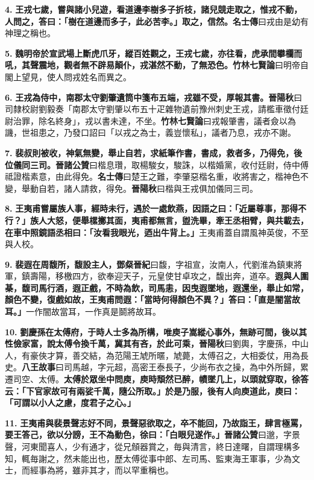 \textbf{4.} \textbf{王戎七歲，嘗與諸小兒遊，看道邊李樹多子折枝，諸兒競走取之，惟戎不動，人問之，答曰：「樹在道邊而多子，此必苦李。」取之，信然。}{\footnotesize \textbf{名士傳}曰戎由是幼有神理之稱也。}

\textbf{5.} \textbf{魏明帝於宣武場上斷虎爪牙，縱百姓觀之，王戎七歲，亦往看，虎承間攀欄而吼，其聲震地，觀者無不辟易顛仆，戎湛然不動，了無恐色。}{\footnotesize \textbf{竹林七賢論}曰明帝自閣上望見，使人問戎姓名而異之。}

\textbf{6.} \textbf{王戎為侍中，南郡太守劉肇遺筒中箋布五端，戎雖不受，厚報其書。}{\footnotesize \textbf{晉陽秋}曰司隸校尉劉毅奏「南郡太守劉肇以布五十疋雜物遺前豫州刺史王戎，請檻車徵付廷尉治罪，除名終身」，戎以書未達，不坐。\textbf{竹林七賢論}曰戎報肇書，議者僉以為譏，世祖患之，乃發口詔曰「以戎之為士，義豈懷私」，議者乃息，戎亦不謝。}

\textbf{7.} \textbf{裴叔則被收，神氣無變，舉止自若，求紙筆作書，書成，救者多，乃得免，後位儀同三司。}{\footnotesize \textbf{晉諸公贊}曰楷息瓚，取楊駿女，駿誅，以楷婚黨，收付廷尉，侍中傅祗證楷素意，由此得免。\textbf{名士傳}曰楚王之難，李肇惡楷名重，收將害之，楷神色不變，舉動自若，諸人請救，得免。\textbf{晉陽秋}曰楷與王戎俱加儀同三司。}

\textbf{8.} \textbf{王夷甫嘗屬族人事，經時未行，遇於一處飲燕，因語之曰：「近屬尊事，那得不行？」族人大怒，便舉樏擲其面，夷甫都無言，盥洗畢，牽王丞相臂，與共載去，在車中照鏡語丞相曰：「汝看我眼光，迺出牛背上。」}{\footnotesize 王夷甫蓋自謂風神英俊，不至與人校。}

\textbf{9.} \textbf{裴遐在周馥所，馥設主人，}{\footnotesize \textbf{鄧粲晉紀}曰馥，字祖宣，汝南人，代劉淮為鎮東將軍，鎮壽陽，移檄四方，欲奉迎天子，元皇使甘卓攻之，馥出奔，道卒。}\textbf{遐與人圍棊，馥司馬行酒，遐正戲，不時為飲，司馬恚，因曳遐墜地，遐還坐，舉止如常，顏色不變，復戲如故，王夷甫問遐：「當時何得顏色不異？」答曰：「直是闇當故耳。」}{\footnotesize 一作闇故當耳，一作真是鬬將故耳。}

\textbf{10.} \textbf{劉慶孫在太傅府，于時人士多為所構，唯庾子嵩縱心事外，無跡可間，後以其性儉家富，說太傅令換千萬，冀其有吝，於此可乘，}{\footnotesize \textbf{晉陽秋}曰劉輿，字慶孫，中山人，有豪俠才算，善交結，為范陽王虓所暱，虓薨，太傅召之，大相委仗，用為長史。\textbf{八王故事}曰司馬越，字元超，高密王泰長子，少尚布衣之操，為中外所歸，累遷司空、太傅。}\textbf{太傅於眾坐中問庾，庾時頽然已醉，幘墜几上，以頭就穿取，徐答云：「下官家故可有兩娑千萬，隨公所取。」於是乃服，後有人向庾道此，庾曰：「可謂以小人之慮，度君子之心。」}

\textbf{11.} \textbf{王夷甫與裴景聲志好不同，景聲惡欲取之，卒不能回，乃故詣王，肆言極罵，要王答己，欲以分謗，王不為動色，徐曰：「白眼兒遂作。」}{\footnotesize \textbf{晉諸公贊}曰邈，字景聲，河東聞喜人，少有通才，從兄頠器賞之，毎與清言，終日達曙，自謂理構多知，輒毎謝之，然未能出也，歷太傅從事中郎、左司馬、監東海王軍事，少為文士，而經事為將，雖非其才，而以罕重稱也。}

